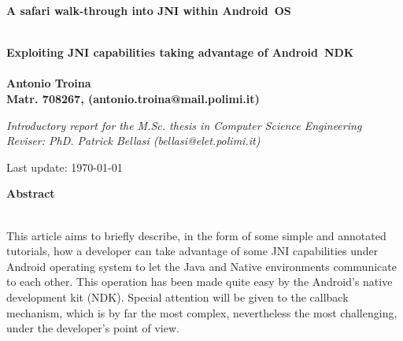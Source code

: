 \documentclass[a4paper,10pt]{article}
\newenvironment*{mytitle}{\begin{LARGE}\bf}{\end{LARGE}\\}%
\newenvironment*{mysubtitle}{\bf}{\\[1.5ex]}%
\newenvironment*{myabstract}{\begin{Large}\bf}{\end{Large}\\[2.5ex]}%
\begin{document}
\begin{mytitle}A safari walk-through into JNI within Android\texttrademark \ OS\end{mytitle}
\begin{mysubtitle}
Exploiting JNI capabilities taking advantage of Android\texttrademark \ NDK
\end{mysubtitle}
%
%
\\
Antonio Troina\\
Matr. 708267, (antonio.troina@mail.polimi.it)\\
\hspace{10ex}
\begin{flushright}
\emph{Introductory report for the M.Sc. thesis in Computer Science Engineering}\\
\emph{Reviser: PhD. Patrick Bellasi (bellasi@elet.polimi.it)}
\end{flushright}

Last update: \today
\\
\hspace{10ex}

\begin{myabstract} Abstract \end{myabstract}
This article aims to briefly describe, in the form of some simple and annotated
tutorials, how a developer can take advantage of some JNI capabilities under
Android operating system to let the Java and Native environments communicate to
each other. This operation has been made quite easy by the Android's native
development kit (NDK). Special attention will be given to the callback mechanism, 
which is by far the most complex, nevertheless the most challenging, under the
developer's point of view.
\end{document}
